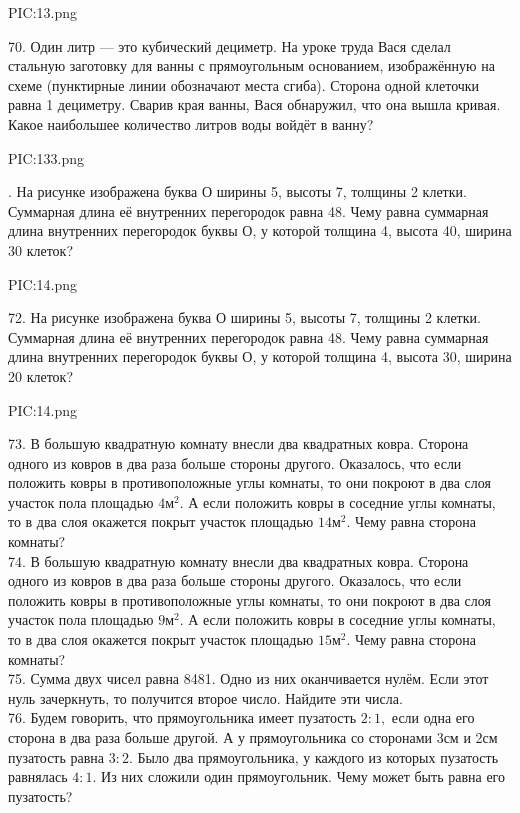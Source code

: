 \begin{center}
{{PIC:13.png}}
\end{center}
70. Один литр --- это кубический дециметр. На уроке труда Вася сделал стальную заготовку для ванны с прямоугольным основанием, изображённую на схеме (пунктирные линии обозначают места сгиба). Сторона одной клеточки равна 1 дециметру. Сварив края ванны, Вася обнаружил, что она вышла кривая. Какое наибольшее количество литров воды войдёт в ванну?
\begin{center}
{{PIC:133.png}}
\end{center}
\newpage
{}. На рисунке изображена буква О ширины 5, высоты 7, толщины 2 клетки. Суммарная длина её внутренних перегородок равна 48. Чему равна суммарная длина внутренних перегородок буквы О, у которой толщина 4, высота 40, ширина 30 клеток?
\begin{center}
{{PIC:14.png}}
\end{center}
72. На рисунке изображена буква О ширины 5, высоты 7, толщины 2 клетки. Суммарная длина её внутренних перегородок равна 48. Чему равна суммарная длина внутренних перегородок буквы О, у которой толщина 4, высота 30, ширина 20 клеток?
\begin{center}
{{PIC:14.png}}
\end{center}
73. В большую квадратную комнату внесли два квадратных ковра. Сторона одного из ковров в два раза больше стороны другого. Оказалось, что если положить ковры в противоположные углы комнаты, то они покроют в два слоя участок пола площадью $4\text{м}^2.$ А если положить ковры в соседние углы комнаты, то в два слоя окажется покрыт участок площадью $14\text{м}^2.$ Чему равна сторона комнаты?\\
74. В большую квадратную комнату внесли два квадратных ковра. Сторона одного из ковров в два раза больше стороны другого. Оказалось, что если положить ковры в противоположные углы комнаты, то они покроют в два слоя участок пола площадью $9\text{м}^2.$ А если положить ковры в соседние углы комнаты, то в два слоя окажется покрыт участок площадью $15\text{м}^2.$ Чему равна сторона комнаты?\\
75. Сумма двух чисел равна 8481. Одно из них оканчивается нулём. Если этот нуль зачеркнуть, то получится второе число. Найдите эти числа.\\
76. Будем говорить, что прямоугольника имеет пузатость $2:1,$ если одна его сторона в два раза больше другой. А у прямоугольника со сторонами 3см и 2см пузатость равна $3:2.$ Было два прямоугольника, у каждого из которых пузатость равнялась $4:1.$ Из них сложили один прямоугольник. Чему может быть равна его пузатость?\\

